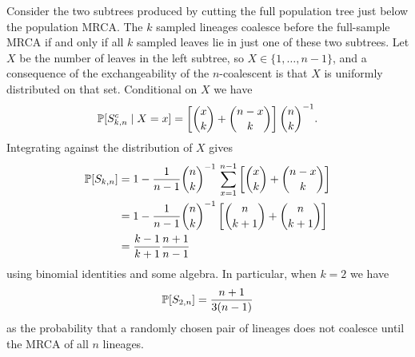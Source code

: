Consider the two subtrees produced by cutting the full population tree just below the population MRCA. The $k$ sampled lineages coalesce before the full-sample MRCA if and only if all $k$ sampled leaves lie in just one of these two subtrees.
Let $X$ be the number of leaves in the left subtree, so $X \in \{1,\dots,n-1\} $, and a consequence of the exchangeability of the $n$-coalescent is that $X$ is uniformly distributed on that set.
Conditional on $X$ we have
\begin{equation*}
\mathbb{P} [S_{k,n}^c \mid X=x]
= \left[ \binom{x}{k} + \binom{n-x}{k} \right] \binom{n}{k}^{-1} .
\end{equation*}
Integrating against the distribution of $X$ gives
\begin{align*}
\mathbb{P}[ S_{k,n} ]
&= 1 - \frac{1}{n-1} \binom{n}{k}^{-1} \, \sum_{x=1}^{n-1} 
        \left[ \binom{x}{k} + \binom{n-x}{k} \right] \\
&= 1 - \frac{1}{n-1} \binom{n}{k}^{-1} 
        \left[ \binom{n}{k+1} + \binom{n}{k+1} \right] \\
&= \frac{k-1}{k+1} \frac{n+1}{n-1}
\end{align*}
using binomial identities and some algebra.
In particular, when $k=2$ we have
\begin{equation*}
\mathbb{P}[ S_{2,n} ]
=\frac{n+1}{3(n-1)} 
\end{equation*}
as the probability that a randomly chosen pair of lineages does not coalesce until the MRCA of all $n$ lineages.
%
%



